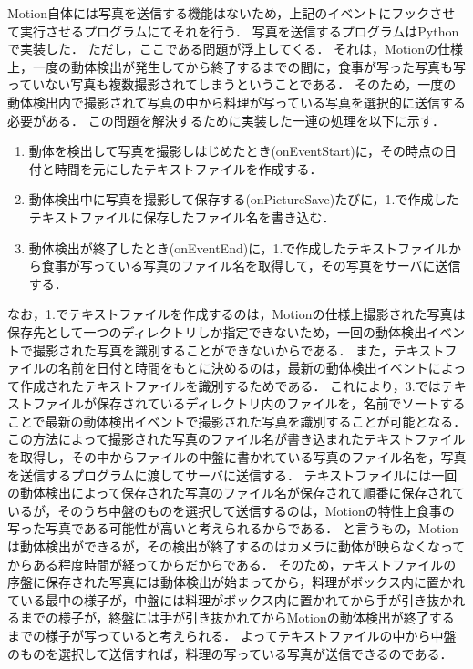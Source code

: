 \documentclass[../report]{subfiles}
\begin{document}
Motion自体には写真を送信する機能はないため，上記のイベントにフックさせて実行させるプログラムにてそれを行う．
写真を送信するプログラムはPythonで実装した．
ただし，ここである問題が浮上してくる．
それは，Motionの仕様上，一度の動体検出が発生してから終了するまでの間に，食事が写った写真も写っていない写真も複数撮影されてしまうということである．
そのため，一度の動体検出内で撮影されて写真の中から料理が写っている写真を選択的に送信する必要がある．
この問題を解決するために実装した一連の処理を以下に示す．
\begin{enumerate}
    \item 動体を検出して写真を撮影しはじめたとき(onEventStart)に，その時点の日付と時間を元にしたテキストファイルを作成する．
    \item 動体検出中に写真を撮影して保存する(onPictureSave)たびに，1.で作成したテキストファイルに保存したファイル名を書き込む．
    \item 動体検出が終了したとき(onEventEnd)に，1.で作成したテキストファイルから食事が写っている写真のファイル名を取得して，その写真をサーバに送信する．
\end{enumerate}
なお，1.でテキストファイルを作成するのは，Motionの仕様上撮影された写真は保存先として一つのディレクトリしか指定できないため，一回の動体検出イベントで撮影された写真を識別することができないからである．
また，テキストファイルの名前を日付と時間をもとに決めるのは，最新の動体検出イベントによって作成されたテキストファイルを識別するためである．
これにより，3.ではテキストファイルが保存されているディレクトリ内のファイルを，名前でソートすることで最新の動体検出イベントで撮影された写真を識別することが可能となる．
この方法によって撮影された写真のファイル名が書き込まれたテキストファイルを取得し，その中からファイルの中盤に書かれている写真のファイル名を，写真を送信するプログラムに渡してサーバに送信する．
テキストファイルには一回の動体検出によって保存された写真のファイル名が保存されて順番に保存されているが，そのうち中盤のものを選択して送信するのは，Motionの特性上食事の写った写真である可能性が高いと考えられるからである．
と言うもの，Motionは動体検出ができるが，その検出が終了するのはカメラに動体が映らなくなってからある程度時間が経ってからだからである．
そのため，テキストファイルの序盤に保存された写真には動体検出が始まってから，料理がボックス内に置かれている最中の様子が，中盤には料理がボックス内に置かれてから手が引き抜かれるまでの様子が，終盤には手が引き抜かれてからMotionの動体検出が終了するまでの様子が写っていると考えられる．
よってテキストファイルの中から中盤のものを選択して送信すれば，料理の写っている写真が送信できるのである．
\end{document}
